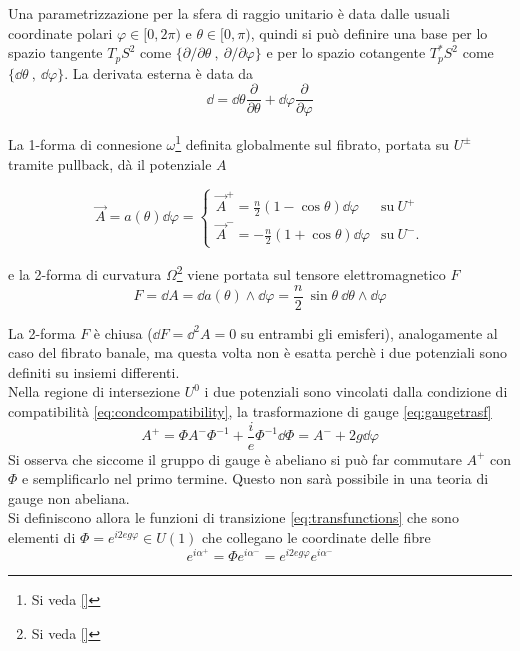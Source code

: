 Una parametrizzazione per la sfera di raggio unitario è data dalle usuali
coordinate polari $\varphi  \in[0,2\pi)$ e $\theta \in [0,\pi)$,
quindi si può definire una base per lo spazio tangente $T_pS^2$ come
$\{ \partial / \partial \theta \: , \: \partial / \partial \varphi  \}$
e per lo spazio cotangente $T^*_pS^2$ come $\{ \dd \theta \: , \: \dd \varphi  \}$.
La derivata esterna è data da
$$
   \dd  = \dd \theta \frac{\partial}{\partial \theta}
        + \dd \varphi    \frac{\partial}{\partial \varphi  }
$$

La 1-forma di connesione $\omega$\footnote{Si veda \ref{}}
definita globalmente sul fibrato, portata su $U^\pm$ tramite pullback,
dà il potenziale $A$

\begin{equation}\label{eq:hopfpotential}
   \vec A = a(\theta)\dd \varphi =  \begin{cases}
      \vec A^+ =  \frac{n}{2}(1 - \cos\theta ) \dd \varphi  & \mathrm{su \:} U^+ \\
      \vec A^- = -\frac{n}{2}(1 + \cos\theta ) \dd \varphi  & \mathrm{su \:} U^- .
   \end{cases}
\end{equation}

e la 2-forma di curvatura $\Omega$\footnote{Si veda \ref{}} viene portata
sul tensore elettromagnetico $F$
$$
   F = \dd A = \dd a(\theta)\wedge \dd \varphi= \frac{n}{2} \: \sin\theta \: \dd \theta \wedge \dd \varphi
$$

La 2-forma $F$ è chiusa ($\dd F = \dd ^2A = 0$ su entrambi gli emisferi),
analogamente al caso del fibrato banale, ma questa volta non è esatta perchè i due potenziali
sono definiti su insiemi differenti.\\

Nella regione di intersezione $U^0$ i due potenziali sono vincolati dalla condizione
di compatibilità \ref{eq:condcompatibility}, la trasformazione di gauge \ref{eq:gaugetrasf}
$$
   A^+ = \Phi A^- \Phi ^{-1} + \frac{i}{e}\Phi ^{-1} \dd \Phi
       = A^- + 2g \dd  \varphi
$$
Si osserva che siccome il gruppo di gauge è abeliano si può far commutare $A^+$
con $\Phi$ e semplificarlo nel primo termine. Questo non sarà possibile in una
teoria di gauge non abeliana. \\
Si definiscono allora le funzioni di transizione \ref{eq:transfunctions}
che sono elementi di $\Phi = e^{i 2eg \varphi} \in U(1)$ che collegano le coordinate delle fibre
$$
    e^{i\alpha^+} = \Phi  e^{i\alpha^-} = e^{i2eg\varphi } e^{i\alpha^-}
$$

